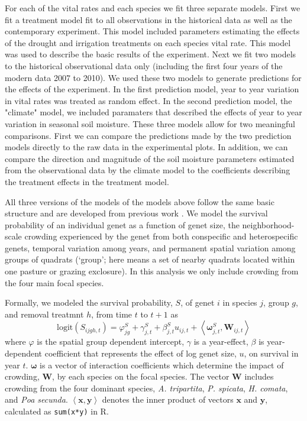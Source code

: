 \documentclass[11pt]{article}
\begin{document}
\begin{doublespacing}
For each of the vital rates and each species we fit three separate models.  First we fit a treatment model fit to all observations in the historical data as well as the contemporary experiment.  This model included parameters estimating the effects of the drought and irrigation treatments on each species vital rate. This model was used to describe the basic results of the experiment. Next we fit two models to the historical observational data only (including the first four years of the modern data 2007 to 2010). We used these two models to generate predictions for the effects of the experiment. In the first prediction model, year to year variation in vital rates was treated as random effect. In the second prediction model, the "climate" model, we included paramaters that described the effects of year to year variation in seasonal soil moisture. These three models allow for two meaningful comparisons.  First we can compare the predictions made by the two prediction models directly to the raw data in the experimental plots.  In addition, we can compare the direction and magnitude of the soil moisture parameters estimated from the observational data by the climate model to the coefficients describing the treatment effects in the treatment model.      

All three versions of the models of the models above follow the same basic structure and are developed from previous work \citep{adler_coexistence_2010,chu_large_2015}. We model the survival probability of an individual genet as a function of genet size, the neighborhood-scale crowding experienced by the genet from both conspecific and heterospecific genets, temporal variation among years, and permanent spatial variation among groups of quadrats (`group'; here means a set of nearby quadrats located within one pasture or grazing exclosure). In this analysis we only include crowding from the four main focal species. 

Formally, we modeled the survival probability, $S$, of genet $i$ in species $j$, group $g$, and removal treatmnt $h$, from time $t$ to $t+1$  as
\begin{equation}
\mbox{logit}(S_{ijgh,t}) = \varphi_{jg}^S + \gamma_{j,t}^S  + \beta_{j,t}^S u_{ij,t} +  
\left \langle \boldsymbol{\omega}_{j,t}^S, \boldsymbol{W}_{ij,t} \right \rangle 
\label{eqn:survReg}
\end{equation}
where $\varphi$ is the spatial group dependent intercept, $\gamma$ is a year-effect, $\beta$ is year-dependent coefficient that represents the effect of log genet size, $u$, on survival in year $t$. $\boldsymbol{\omega}$ is a vector of interaction coefficients which determine the impact of crowding, $\boldsymbol{W}$, by each species on the focal species. The vector $\boldsymbol{W}$ includes crowding from the four dominant species, \textit{A. tripartita}, \textit{P. spicata}, \textit{H. comata}, and \textit{Poa secunda}. 
$\left \langle \boldsymbol{x, y} \right \rangle$ denotes the inner product of vectors $\boldsymbol{x}$ and $\boldsymbol{y}$, 
calculated as \texttt{sum(x*y)} in R.


\end{doublespacing}
\end{document}
